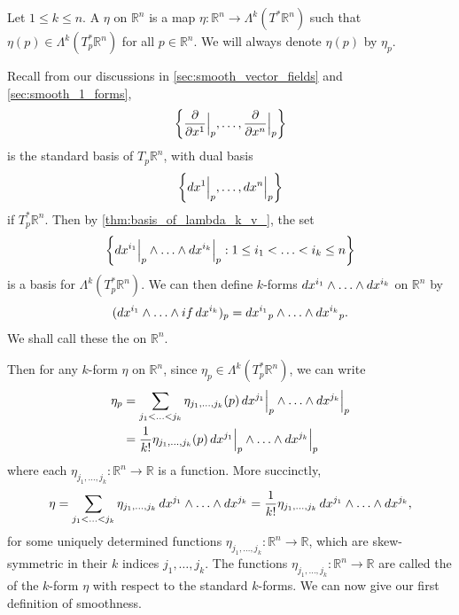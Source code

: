 \documentclass[notoc,notitlepage]{tufte-book}
\begin{document}
\begin{defn}\label{defn:_k_form_on_r_n_}
  Let $1 \leq k \leq n$. A  $\eta$ on $\mathbb{R}^n$ is a map $\eta : 
  \mathbb{R}^n \to \Lambda^k(T^* \mathbb{R}^n)$ such that $\eta(p) \in \Lambda^k(T_p^* 
  \mathbb{R}^n)$ for all $p \in \mathbb{R}^n$. We will always denote $\eta(p)$ by $\eta_p$.
\end{defn}

Recall from our discussions in \cref{sec:smooth_vector_fields} and \cref{sec:smooth_1_forms},
\begin{equation*}
  \left\{ \frac{\partial}{\partial x^1} \Big|_{p}^{}, \ldots, \frac{\partial}{\partial x^n} \Big|_{p}^{}  \right\}
\end{equation*}
is the standard basis of $T_p \mathbb{R}^n$, with dual basis
\begin{equation*}
  \left\{ \mathop{}\!d{x^1}\Big|_{p}^{}, \ldots, \mathop{}\!d{x^n}\Big|_{p}^{} \right\}
\end{equation*}
if $T_p^* \mathbb{R}^n$. Then by \cref{thm:basis_of_lambda_k_v_}, the set
\begin{equation*}
  \left\{ \mathop{}\!d{x^{i_1}}\Big|_{p}^{} \land \hdots \land \mathop{}\!d{x^{i_k}}\Big|_{p}^{} : 1 \leq i_1 < \hdots < i_k\leq n \right\}
\end{equation*}
is a basis for $\Lambda^k(T_p^* \mathbb{R}^n)$. We can then define $k$-forms $\mathop{}\!d{x^{i_1}} \land
\hdots \land \mathop{}\!d{x^{i_k}}$ on $\mathbb{R}^n$ by
\begin{equation*}
  (\mathop{}\!d{x^{i_1}} \land \hdots \land if  \mathop{}\!d{x^{i_k}})_p = \mathop{}\!d{x^{i_1}}_p \land \hdots \land \mathop{}\!d{x^{i_k}}_p.
\end{equation*}
We shall call these the  on $\mathbb{R}^n$.

Then for any $k$-form $\eta$ on $\mathbb{R}^n$, since $\eta_p \in \Lambda^k(T_p^* \mathbb{R}^n)$,
we can write
\begin{align}
  \eta_p 
  &= \sum_{j_1 < \hdots < j_k} \eta_{j_1, \ldots, j_k}(p)
  \mathop{}\!d{x^{j_1}}\Big|_{p}^{} \land \hdots \land \mathop{}\!d{x^{j_k}} \Big|_{p}^{} \nonumber \\
  &= \frac{1}{k!} \eta_{j_1, \ldots, j_k}(p) \mathop{}\!d{x^{j_1}} \Big|_{p}^{} \land
  \hdots \land \mathop{}\!d{x^{j_k}} \Big|_{p}^{} \label{eq:k_forms_using_differentials_eval_at_p}
\end{align}
where each $\eta_{j_1, \ldots, j_k} : \mathbb{R}^n \to \mathbb{R}$ is a function. More succinctly,
\begin{equation}\label{eq:k_forms_using_differentials}
  \eta 
    = \sum_{j_1 < \ldots < j_k} \eta_{j_1, \ldots, j_k} 
      \mathop{}\!d{x^{j_1}} \land \hdots \land \mathop{}\!d{x^{j_k}}
    = \frac{1}{k!} \eta_{j_1, \ldots, j_k} \mathop{}\!d{x^{j_1}} \land \hdots \land \mathop{}\!d{x^{j_k}},
\end{equation}
for some uniquely determined functions $\eta_{j_1, \ldots, j_k} : \mathbb{R}^n \to \mathbb{R}$,
which are skew-symmetric in their $k$ indices $j_1, \ldots, j_k$. The functions $\eta_{j_1,
\ldots, j_k} : \mathbb{R}^n \to \mathbb{R}$ are called the  of the
$k$-form $\eta$ with respect to the standard $k$-forms. We can now give our first definition
of smoothness.
\end{document}
